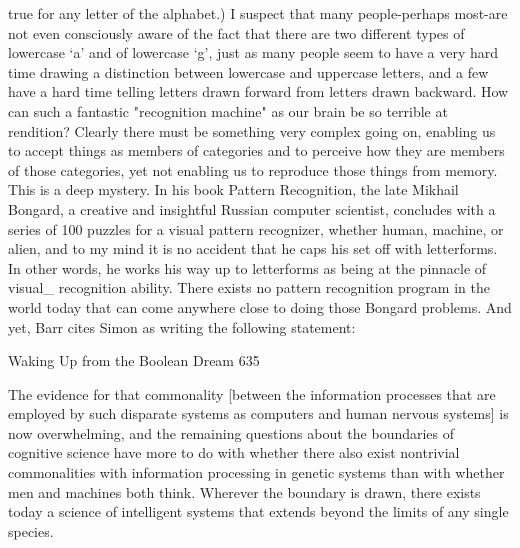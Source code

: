 true for any letter of the alphabet.) I suspect that many people-perhaps most-are not
even consciously aware of the fact that there are two different types of lowercase `a'
and of lowercase `g', just as many people seem to have a very hard time drawing a
distinction between lowercase and uppercase letters, and a few have a hard time
telling letters drawn forward from letters drawn backward.
         How can such a fantastic "recognition machine" as our brain be so terrible at
rendition? Clearly there must be something very complex going on, enabling us to
accept things as members of categories and to perceive how they are members of
those categories, yet not enabling us to reproduce those things from memory. This is a
deep mystery.
         In his book Pattern Recognition, the late Mikhail Bongard, a creative and
insightful Russian computer scientist, concludes with a series of 100 puzzles for a
visual pattern recognizer, whether human, machine, or alien, and to my mind it is no
accident that he caps his set off with letterforms. In other words, he works his way up
to letterforms as being at the pinnacle of visual\_ recognition ability. There exists no
pattern recognition program in the world today that can come anywhere close to doing
those Bongard problems. And yet, Barr cites Simon as writing the following
statement:




Waking Up from the Boolean Dream                                                       635

   The evidence for that commonality [between the information processes that are
   employed by such disparate systems as computers and human nervous systems]
   is now overwhelming, and the remaining questions about the boundaries of
   cognitive science have more to do with whether there also exist nontrivial
   commonalities with information processing in genetic systems than with
   whether men and machines both think. Wherever the boundary is drawn, there
   exists today a science of intelligent systems that extends beyond the limits of
   any single species.

